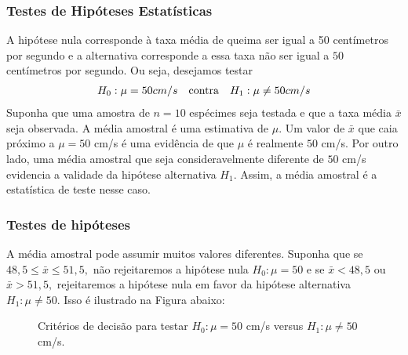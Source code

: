 \documentclass[14pt,aspectratio=1610]{beamer}
\begin{document}
\begin{frame}{}
\frametitle{ Testes de Hipóteses Estatísticas}
\small
\begin{block}{}
\justifying
A hipótese nula corresponde à taxa média de queima ser igual a 50 centímetros por segundo e a alternativa corresponde a essa taxa não ser igual a $50$ centímetros 
por segundo. Ou seja, desejamos testar
\begin{align*}
\centering
H_{0}: \mu=50 cm/s &&\textrm{contra}&& H_{1}:\mu \neq 50 cm/s
\end{align*}
Suponha que uma amostra de $n = 10$ espécimes seja testada e que a taxa média $\bar{x}$ seja observada. A média amostral é uma estimativa de $\mu.$ Um valor de 
$\bar{x}$ que caia próximo a $\mu = 50$ cm/s é uma evidência de que $\mu$ é realmente $50$ cm/s. Por outro lado, 
uma média amostral que seja consideravelmente diferente de $50$ cm/s evidencia a validade da hipótese alternativa $H_{1}.$ Assim, a média amostral 
é a estatística de teste nesse caso.
\end{block}
\end{frame}


\begin{frame}{}
\frametitle{Testes de hipóteses}
\vspace{-0.5cm}
\begin{block}{}
\justifying
A média amostral pode assumir muitos valores diferentes. Suponha que se $48,5 \leq \bar{x}\leq 51,5,$ não rejeitaremos a hipótese nula $H_{0}:\mu = 50$ e se 
$\bar{x} < 48,5$ ou $\bar{x} > 51,5,$ rejeitaremos a hipótese nula em favor da hipótese alternativa $H_{1}:\mu \neq 50.$ Isso é ilustrado na Figura abaixo:
 \end{block}\pause
 \vspace{-1.5cm}
\begin{block}{}
\begin{figure}
\centering
{}
\caption{Critérios de decisão para testar $H_{0}:\mu = 50$ cm/s versus $H_{1}: \mu \neq 50$ cm/s.} \label{fig:M1}
\end{figure}
 \end{block}
\end{frame}
\end{document}
